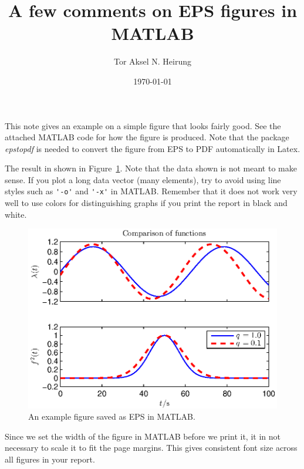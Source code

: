 \documentclass[12pt, USenglish, a4paper]{article}
\author{Tor Aksel N. Heirung}
\title{A few comments on EPS figures in MATLAB}
\date{\today}
\begin{document}
\maketitle
\thispagestyle{empty}

This note gives an example on a simple figure that looks fairly good. See the attached MATLAB code for how the figure is produced. Note that the package \emph{epstopdf} is needed to convert the figure from EPS to PDF automatically in Latex.

The result in shown in Figure~\ref{fig:testfig}. Note that the data shown is not meant to make sense. If you plot a long data vector (many elements), try to avoid using line styles such as \verb|'-o'| and \verb|'-x'| in MATLAB. Remember that it does not work very well to use colors for distinguishing graphs if you print the report in black and white.

\begin{figure}[htb]
	\centering
		\includegraphics{testfig.eps}
	\caption{An example figure saved as EPS in MATLAB.}
	\label{fig:testfig}
\end{figure}

Since we set the width of the figure in MATLAB before we print it, it in not necessary to scale it to fit the page margins. This gives consistent font size across all figures in your report.
\end{document}
